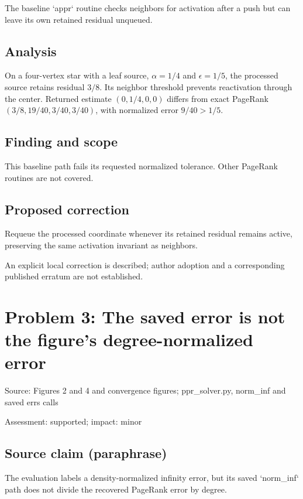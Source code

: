 \documentclass[11pt]{article}
\begin{document}
The baseline `appr` routine checks neighbors for activation after a push but can leave its own retained residual unqueued.

\subsection*{Analysis}

On a four-vertex star with a leaf source, \(\alpha=1/4\) and \(\epsilon=1/5\), the processed source retains residual \(3/8\). Its neighbor threshold prevents reactivation through the center. Returned estimate \((0,1/4,0,0)\) differs from exact PageRank \((3/8,19/40,3/40,3/40)\), with normalized error \(9/40>1/5\).

\subsection*{Finding and scope}

This baseline path fails its requested normalized tolerance. Other PageRank routines are not covered.

\subsection*{Proposed correction}

Requeue the processed coordinate whenever its retained residual remains active, preserving the same activation invariant as neighbors.

An explicit local correction is described; author adoption and a corresponding published erratum are not established.

\section*{Problem 3: The saved error is not the figure’s degree-normalized error}

Source: Figures 2 and 4 and convergence figures; ppr\_solver.py, norm\_inf and saved errs calls

Assessment: supported; impact: minor

\subsection*{Source claim (paraphrase)}

The evaluation labels a density-normalized infinity error, but its saved `norm\_inf` path does not divide the recovered PageRank error by degree.
\end{document}
